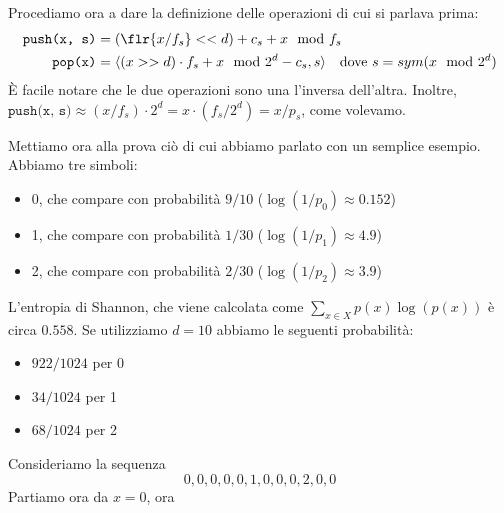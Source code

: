Procediamo ora a dare la definizione delle operazioni di cui si parlava prima:
\begin{align*}
\texttt{push(x, s)} &= (\flr{x / f_s} << d) + c_s + x \mod f_s \\
\texttt{pop(x)} &= \langle (x >> d) \cdot f_s + x \mod 2^d - c_s, s \rangle \quad \textnormal{dove $s = sym(x \mod 2^d)$}
\end{align*}
È facile notare che le due operazioni sono una l'inversa dell'altra. Inoltre, $\texttt{push(x, s)} \approx (x / f_s) \cdot 2^d = x \cdot (f_s / 2^d) = x / p_s$, come volevamo.

Mettiamo ora alla prova ciò di cui abbiamo parlato con un semplice esempio. Abbiamo tre simboli:
\begin{itemize}
    \item 0, che compare con probabilità $9 / 10$ ($\log(1/p_0) \approx 0.152$)
    \item 1, che compare con probabilità $1 / 30$ ($\log(1/p_1) \approx 4.9$)
    \item 2, che compare con probabilità $2 / 30$ ($\log(1/p_2) \approx 3.9$)
\end{itemize}
L'entropia di Shannon, che viene calcolata come $\sum_{x \in X}p(x) \log(p(x))$ è circa $0.558$. Se utilizziamo $d = 10$ abbiamo le seguenti probabilità:
\begin{itemize}
    \item $922 / 1024$ per 0
    \item $34 / 1024$ per 1
    \item $68 / 1024$ per 2
\end{itemize}
Consideriamo la sequenza
\begin{equation*}
    0, 0, 0, 0, 0, 1, 0, 0, 0, 2, 0, 0
\end{equation*}
Partiamo ora da $x = 0$, ora
